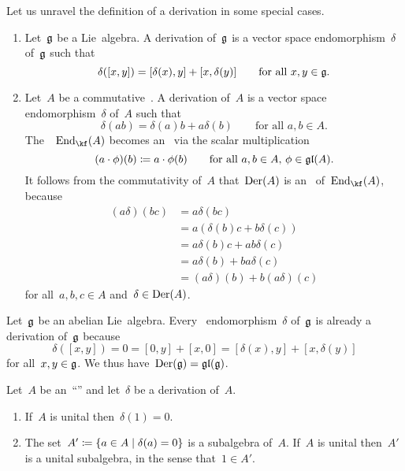 \begin{remark}
  \label{derivations made explicit}
  Let us unravel the definition of a derivation in some special cases.
  \begin{enumerate}
    \item
      Let~$\mathfrak{g}$ be a Lie~algebra.
      A derivation of~$\mathfrak{g}$ is a vector space endomorphism~$\delta$ of~$\mathfrak{g}$ such that
      \[
        \delta([x,y])
        =
        [\delta(x), y] + [x, \delta(y)]
        \qquad
        \text{for all~$x, y \in \mathfrak{g}$.}
      \]
    \item
      Let~$A$ be a commutative~\algebra{$\kf$}.
      A derivation of~$A$ is a vector space endomorphism~$\delta$ of~$A$ such that
      \[
        \delta(ab)
        =
        \delta(a) b + a \delta(b)
        \qquad
        \text{for all~$a, b \in A$}.
      \]
      The~\vectorspace{$\kf$}~$\End_{\kf}(A)$ becomes an~ via the scalar multiplication
      \[
        (a \cdot \phi)(b)
        \coloneqq
        a \cdot \phi(b)
        \qquad
        \text{for all~$a, b \in A$,~$\phi \in \mathfrak{gl}(A)$.}
      \]
      It follows from the commutativity of~$A$ that~$\operatorname{Der}(A)$ is an~ of~$\End_{\kf}(A)$, because
      \begin{align*}
        (a \delta)(b c)
        &=
        a \delta(b c)
        \\
        &=
        a ( \delta(b) c + b \delta(c) )
        \\
        &=
        a \delta(b) c + a b \delta(c)
        \\
        &=
        a \delta(b) + b a \delta(c)
        \\
        &=
        (a \delta)(b) + b (a \delta)(c)
      \end{align*}
      for all~$a, b, c \in A$ and~$\delta \in \operatorname{Der}(A)$.
  \end{enumerate}
\end{remark}


\begin{example}
  Let~$\mathfrak{g}$ be an abelian Lie~algebra.
  Every~\linear{$\kf$} endomorphism~$\delta$ of~$\mathfrak{g}$ is already a derivation of~$\mathfrak{g}$ because
  \[
    \delta([x,y])
    =
    0
    =
    [0, y] + [x, 0]
    =
    [\delta(x), y] + [x, \delta(y)]
  \]
  for all~$x, y \in \mathfrak{g}$.
  We thus have~$\operatorname{Der}(\mathfrak{g}) = \mathfrak{gl}(\mathfrak{g})$.
\end{example}


\begin{lemma}
  \label{about the kernel of a derivation}
  Let~$A$ be an~\enquote{\algebra{$\kf$}} and let~$\delta$ be a derivation of~$A$.
  \begin{enumerate}
    \item
      If~$A$ is unital then~$\delta(1) = 0$.
    \item
      The set~$A' \defined \{ a \in A \suchthat \delta(a) = 0 \}$ is a subalgebra of~$A$.
      If~$A$ is unital then~$A'$ is a unital subalgebra, in the sense that~$1 \in A'$.
  \end{enumerate}
\end{lemma}


